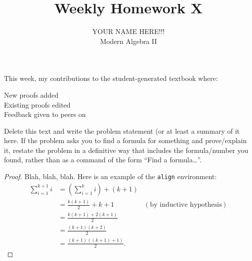 \documentclass[12pt]{amsart}
\newenvironment{problem}[2][Problem]{\begin{trivlist}
\item[\hskip \labelsep {\bfseries #1}\hskip \labelsep {\bfseries #2.}]}{\end{trivlist}}
\begin{document}
 
 
\title{Weekly Homework X}%
\author{YOUR NAME HERE!!!\\ %
Modern Algebra II} %
 
\maketitle

\noindent This week, my contributions to the student-generated textbook where:
\begin{description}
\item[New proofs added] 
\item[Existing proofs edited] 
\item[Feedback given to peers on] 
\end{description}

\begin{problem}{x} %
Delete this text and write the problem statement (or at least a
summary of it here. If the problem asks you to find a formula for
something and prove/explain it, restate the problem in a definitive
way that includes the formula/number you found, rather than as a
command of the form ``Find a formula\dots''. 
\end{problem}
 
\begin{proof}
Blah, blah, blah.  Here is an example of the \texttt{align} environment:
\begin{align*}
\sum_{i=1}^{k+1}i & = \left(\sum_{i=1}^{k}i\right) +(k+1)\\ 
& = \frac{k(k+1)}{2}+k+1 & (\text{by inductive hypothesis})\\
& = \frac{k(k+1)+2(k+1)}{2}\\
& = \frac{(k+1)(k+2)}{2}\\
& = \frac{(k+1)((k+1)+1)}{2}.
\end{align*}
\end{proof}
 
\end{document}
